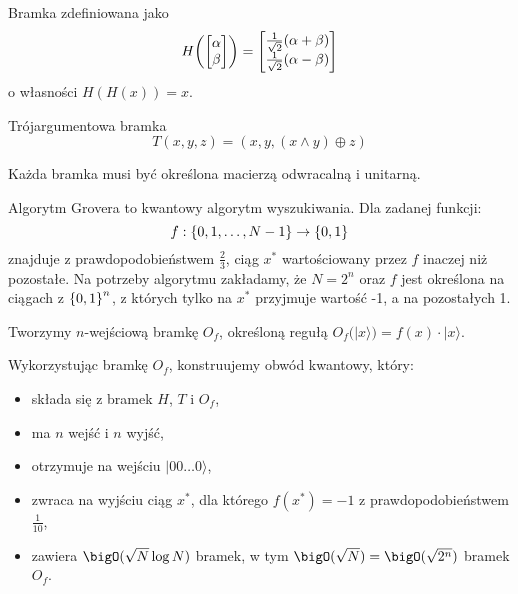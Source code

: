 \begin{definition}
    Bramka zdefiniowana jako
    \[
        H\pars{\begin{bmatrix} \alpha \\ \beta \end{bmatrix}} = \begin{bmatrix} \frac{1}{\sqrt{2}}(\alpha + \beta) \\ \frac{1}{\sqrt{2}}(\alpha - \beta) \end{bmatrix}
    \]
    o własności \( H(H(x)) = x \).
\end{definition}

\begin{definition}
    Trójargumentowa bramka
    \[ T(x, y, z) = (x, y, (x \land y) \oplus z) \]
\end{definition}
Każda bramka musi być określona macierzą odwracalną i unitarną.

Algorytm Grovera to kwantowy algorytm wyszukiwania. Dla zadanej funkcji:
\[
    f : \set{0, 1, \ldots, N - 1} \rightarrow \set{0, 1}
\]
znajduje z prawdopodobieństwem \( \frac{2}{3} \), ciąg \( x^{*} \) wartościowany przez \( f \) inaczej niż pozostałe.
Na potrzeby algorytmu zakładamy, że \( N = 2^n \) oraz \( f \) jest określona na ciągach z \( \set{0, 1}^n \), z których tylko na \( x^{*} \) przyjmuje wartość -1, a na pozostałych 1.

Tworzymy \( n \)-wejściową bramkę \( O_f \), określoną regułą \( O_f (|x\rangle) = f(x) \cdot |x \rangle \).

Wykorzystując bramkę \( O_f \), konstruujemy obwód kwantowy, który:
\begin{itemize}
    \item składa się z bramek \( H \), \( T \) i \( O_f \),
    \item ma \( n \) wejść i \( n \) wyjść,
    \item otrzymuje na wejściu \( |00\ldots0 \rangle \),
    \item zwraca na wyjściu ciąg \( x^{*} \), dla którego \( f(x^{*}) = -1 \) z prawdopodobieństwem \( \frac{1}{10} \),
    \item zawiera \( \bigO(\sqrt{N} \log N) \) bramek, w tym \( \bigO(\sqrt{N}) = \bigO(\sqrt{2^n}) \) bramek \( O_f \).
\end{itemize}

